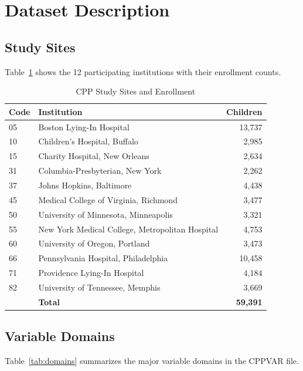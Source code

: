 \documentclass[12pt]{article}
\begin{document}
\section{Dataset Description}

\subsection{Study Sites}

Table~\ref{tab:sites} shows the 12 participating institutions with their enrollment counts.

\begin{table}[H]
\centering
\caption{CPP Study Sites and Enrollment}
\label{tab:sites}
\begin{tabular}{llr}
\toprule
Code & Institution & Children \\
\midrule
05 & Boston Lying-In Hospital & 13,737 \\
10 & Children's Hospital, Buffalo & 2,985 \\
15 & Charity Hospital, New Orleans & 2,634 \\
31 & Columbia-Presbyterian, New York & 2,262 \\
37 & Johns Hopkins, Baltimore & 4,438 \\
45 & Medical College of Virginia, Richmond & 3,477 \\
50 & University of Minnesota, Minneapolis & 3,321 \\
55 & New York Medical College, Metropolitan Hospital & 4,753 \\
60 & University of Oregon, Portland & 3,473 \\
66 & Pennsylvania Hospital, Philadelphia & 10,458 \\
71 & Providence Lying-In Hospital & 4,184 \\
82 & University of Tennessee, Memphis & 3,669 \\
\midrule
& \textbf{Total} & \textbf{59,391} \\
\bottomrule
\end{tabular}
\end{table}

\subsection{Variable Domains}

Table~\ref{tab:domains} summarizes the major variable domains in the CPPVAR file.
\end{document}

